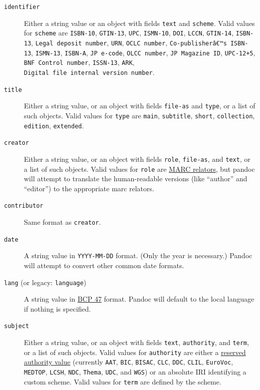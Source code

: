 \documentclass[
]{article}
\begin{document}
\begin{description}
\item[\texttt{identifier}]
Either a string value or an object with fields \texttt{text} and
\texttt{scheme}. Valid values for \texttt{scheme} are \texttt{ISBN-10},
\texttt{GTIN-13}, \texttt{UPC}, \texttt{ISMN-10}, \texttt{DOI},
\texttt{LCCN}, \texttt{GTIN-14}, \texttt{ISBN-13},
\texttt{Legal\ deposit\ number}, \texttt{URN}, \texttt{OCLC\ number},
\texttt{Co-publisherâ€™s\ ISBN-13}, \texttt{ISMN-13}, \texttt{ISBN-A},
\texttt{JP\ e-code}, \texttt{OLCC\ number}, \texttt{JP\ Magazine\ ID},
\texttt{UPC-12+5}, \texttt{BNF\ Control\ number}, \texttt{ISSN-13},
\texttt{ARK}, \texttt{Digital\ file\ internal\ version\ number}.
\item[\texttt{title}]
Either a string value, or an object with fields \texttt{file-as} and
\texttt{type}, or a list of such objects. Valid values for \texttt{type}
are \texttt{main}, \texttt{subtitle}, \texttt{short},
\texttt{collection}, \texttt{edition}, \texttt{extended}.
\item[\texttt{creator}]
Either a string value, or an object with fields \texttt{role},
\texttt{file-as}, and \texttt{text}, or a list of such objects. Valid
values for \texttt{role} are
\href{https://loc.gov/marc/relators/relaterm.html}{MARC relators}, but
pandoc will attempt to translate the human-readable versions (like
``author'' and ``editor'') to the appropriate marc relators.
\item[\texttt{contributor}]
Same format as \texttt{creator}.
\item[\texttt{date}]
A string value in \texttt{YYYY-MM-DD} format. (Only the year is
necessary.) Pandoc will attempt to convert other common date formats.
\item[\texttt{lang} (or legacy: \texttt{language})]
A string value in \href{https://tools.ietf.org/html/bcp47}{BCP 47}
format. Pandoc will default to the local language if nothing is
specified.
\item[\texttt{subject}]
Either a string value, or an object with fields \texttt{text},
\texttt{authority}, and \texttt{term}, or a list of such objects. Valid
values for \texttt{authority} are either a
\href{https://idpf.github.io/epub-registries/authorities/}{reserved
authority value} (currently \texttt{AAT}, \texttt{BIC}, \texttt{BISAC},
\texttt{CLC}, \texttt{DDC}, \texttt{CLIL}, \texttt{EuroVoc},
\texttt{MEDTOP}, \texttt{LCSH}, \texttt{NDC}, \texttt{Thema},
\texttt{UDC}, and \texttt{WGS}) or an absolute IRI identifying a custom
scheme. Valid values for \texttt{term} are defined by the scheme.

\end{description}
\end{document}
